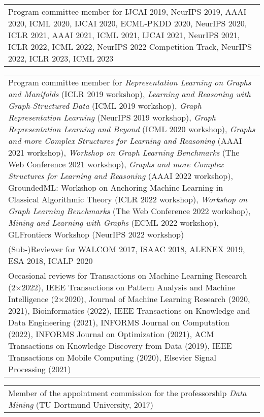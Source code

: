 \documentclass[11pt, a4paper, DIV=12]{scrartcl}
\begin{document}
\begin{tabular}{p{14.5cm}}	
Program committee member for IJCAI 2019, NeurIPS  2019, AAAI 2020, ICML 2020, IJCAI 2020, ECML-PKDD 2020, NeurIPS 2020, ICLR 2021, AAAI 2021, ICML 2021, IJCAI 2021, NeurIPS 2021, ICLR 2022, ICML 2022, NeurIPS 2022 Competition Track, NeurIPS 2022, ICLR 2023, ICML 2023\\[0.5em]
\end{tabular}

\begin{tabular}{p{14.5cm}}
	Program committee member for \emph{Representation Learning on Graphs and Manifolds} (ICLR 2019 workshop), \emph{Learning and Reasoning with Graph-Structured Data} (ICML 2019 workshop), \emph{Graph Representation Learning} (NeurIPS 2019 workshop), \emph{Graph Representation Learning and Beyond} (ICML 2020 workshop), \emph{Graphs and more Complex Structures for Learning and Reasoning} (AAAI 2021 workshop), \emph{Workshop on Graph Learning Benchmarks} (The Web Conference 2021 workshop),  \emph{Graphs and more Complex Structures for Learning and Reasoning} (AAAI 2022 workshop), GroundedML: Workshop on Anchoring Machine Learning in Classical Algorithmic Theory (ICLR 2022 workshop), \emph{Workshop on Graph Learning Benchmarks} (The Web Conference 2022 workshop), \emph{Mining and Learning with Graphs} (ECML 2022 workshop), GLFrontiers Workshop (NeurIPS 2022 workshop)\\[0.5em]
	
	(Sub-)Reviewer for WALCOM 2017, ISAAC 2018, ALENEX 2019, ESA 2018, ICALP 2020 \\[0.5em]
	
	Occasional reviews for Transactions on Machine Learning Research (2$\times$2022), IEEE Transactions on Pattern Analysis and Machine Intelligence (2$\times$2020), Journal of Machine Learning Research (2020, 2021), Bioinformatics (2022), IEEE Transactions on Knowledge and Data Engineering (2021), INFORMS Journal on Computation (2022), INFORMS Journal on Optimization (2021), ACM Transactions on Knowledge Discovery from Data (2019), IEEE Transactions on Mobile Computing (2020), Elsevier Signal Processing (2021)\\[0.5em]
\end{tabular}

\begin{tabular}{p{14.5cm}}
Member of the appointment commission for the professorship \emph{Data Mining} (TU Dortmund University, 2017)
\end{tabular}
\end{document}
